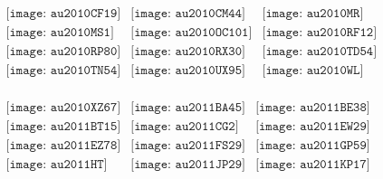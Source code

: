 \documentclass{article}
\begin{document}
\begin{figure}[H]
 \begin{center}$
 \begin{array}{cccc}
\texttt{[image: au2010CF19]}&\texttt{[image: au2010CM44]}&\texttt{[image: au2010MR]}\\\texttt{[image: au2010MS1]}&\texttt{[image: au2010OC101]}&\texttt{[image: au2010RF12]}\\\texttt{[image: au2010RP80]}&\texttt{[image: au2010RX30]}&\texttt{[image: au2010TD54]}\\\texttt{[image: au2010TN54]}&\texttt{[image: au2010UX95]}&\texttt{[image: au2010WL]}\\
\end{array}$
\end{center}
\end{figure}


        \clearpage
        \begin{figure}[H]
 \begin{center}$
 \begin{array}{cccc}
\texttt{[image: au2010XZ67]}&\texttt{[image: au2011BA45]}&\texttt{[image: au2011BE38]}\\\texttt{[image: au2011BT15]}&\texttt{[image: au2011CG2]}&\texttt{[image: au2011EW29]}\\\texttt{[image: au2011EZ78]}&\texttt{[image: au2011FS29]}&\texttt{[image: au2011GP59]}\\\texttt{[image: au2011HT]}&\texttt{[image: au2011JP29]}&\texttt{[image: au2011KP17]}\\
\end{array}$
\end{center}
\end{figure}
\end{document}
